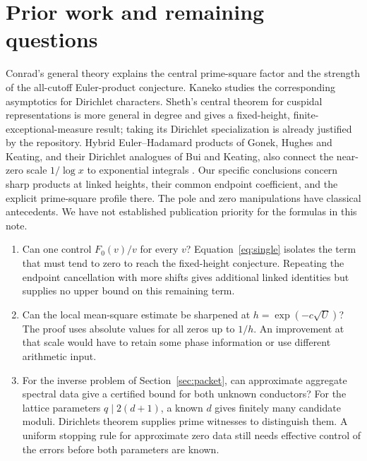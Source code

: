 \documentclass[11pt]{article}
\begin{document}




\section{Prior work and remaining questions}
Conrad's general theory explains the central prime-square factor and the strength of the all-cutoff Euler-product conjecture. Kaneko studies the corresponding asymptotics for Dirichlet characters. Sheth's central theorem for cuspidal representations is more general in degree and gives a fixed-height, finite-exceptional-measure result; taking its Dirichlet specialization is already justified by the repository. Hybrid Euler--Hadamard products of Gonek, Hughes and Keating, and their Dirichlet analogues of Bui and Keating, also connect the near-zero scale $1/\log x$ to exponential integrals \cite{ghk,bk}. Our specific conclusions concern sharp products at linked heights, their common endpoint coefficient, and the explicit prime-square profile there. The pole and zero manipulations have classical antecedents. We have not established publication priority for the formulas in this note.

\begin{enumerate}
\item Can one control $F_0(v)/v$ for every $v$? Equation~\eqref{eq:single} isolates the term that must tend to zero to reach the fixed-height conjecture. Repeating the endpoint cancellation with more shifts gives additional linked identities but supplies no upper bound on this remaining term.
\item Can the local mean-square estimate be sharpened at $h=\exp(-c\sqrt U)$? The proof uses absolute values for all zeros up to $1/h$. An improvement at that scale would have to retain some phase information or use different arithmetic input.
\item For the inverse problem of Section~\ref{sec:packet}, can approximate aggregate spectral data give a certified bound for both unknown conductors? For the lattice parameters $q\mid2(d+1)$, a known $d$ gives finitely many candidate moduli. Dirichlet\textquotesingle s theorem supplies prime witnesses to distinguish them. A uniform stopping rule for approximate zero data still needs effective control of the errors before both parameters are known.
\end{enumerate}
\end{document}
